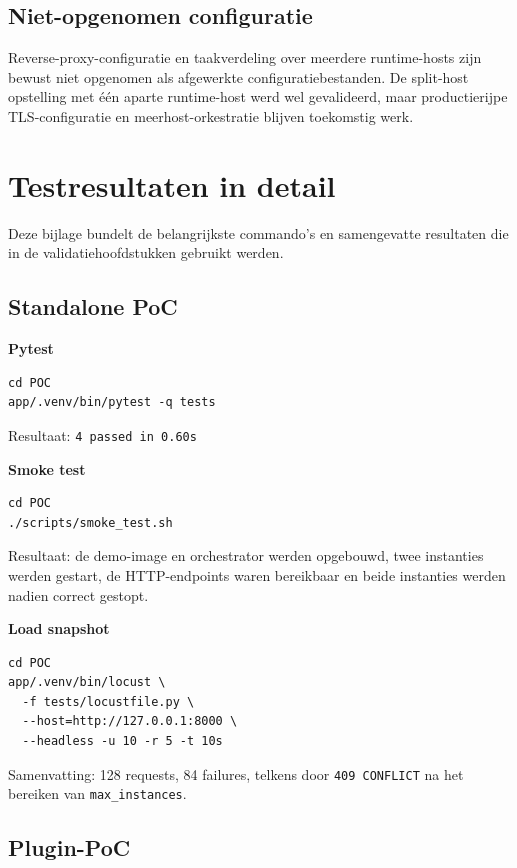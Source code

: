 \documentclass[dutch,dit,thesis]{hogentreport}
\begin{document}
\section*{Niet-opgenomen configuratie}

Reverse-proxy-configuratie en taakverdeling over meerdere runtime-hosts zijn bewust niet opgenomen als afgewerkte configuratiebestanden. De split-host opstelling met één aparte runtime-host werd wel gevalideerd, maar productierijpe TLS-configuratie en meerhost-orkestratie blijven toekomstig werk.

\chapter{Testresultaten in detail}
\label{app:testresultaten}

Deze bijlage bundelt de belangrijkste commando's en samengevatte resultaten die in de validatiehoofdstukken gebruikt werden.

\section*{Standalone PoC}

\textbf{Pytest}
\begin{verbatim}
cd POC
app/.venv/bin/pytest -q tests
\end{verbatim}

Resultaat: \texttt{4 passed in 0.60s}

\textbf{Smoke test}
\begin{verbatim}
cd POC
./scripts/smoke_test.sh
\end{verbatim}

Resultaat: de demo-image en orchestrator werden opgebouwd, twee instanties werden gestart, de HTTP-endpoints waren bereikbaar en beide instanties werden nadien correct gestopt.

\textbf{Load snapshot}
\begin{verbatim}
cd POC
app/.venv/bin/locust \
  -f tests/locustfile.py \
  --host=http://127.0.0.1:8000 \
  --headless -u 10 -r 5 -t 10s
\end{verbatim}

Samenvatting: 128 requests, 84 failures, telkens door \texttt{409 CONFLICT} na het bereiken van \texttt{max\_instances}.

\section*{Plugin-PoC}
\end{document}
